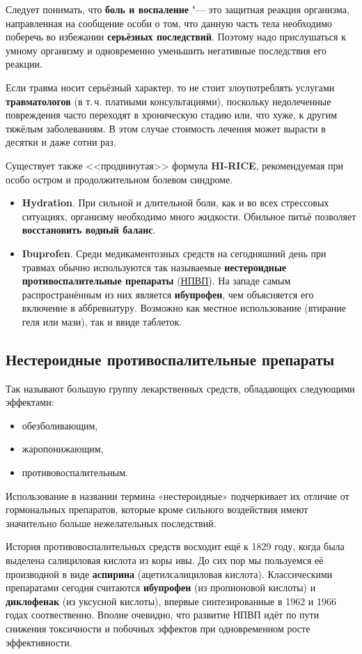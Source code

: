 \documentclass[english,russian,a4paper,12pt]{article}
\begin{document}
Следует понимать, что \textbf{боль и воспаление} "--- это защитная реакция организма, направленная
на сообщение особи о том, что данную часть тела необходимо поберечь во избежании \textbf{серьёзных последствий}.
Поэтому надо прислушаться к умному организму и одновременно уменьшить негативные последствия его реакции.

Если травма носит серьёзный характер, то не стоит злоупотреблять услугами \textbf{травматологов} (в т.\,ч. платными консультациями),
поскольку недолеченные повреждения часто переходят в хроническую стадию или, что хуже, к другим тяжёлым заболеваниям.
В этом случае стоимость лечения может вырасти в десятки и даже сотни раз.

Существует также <<продвинутая>> формула \textbf{HI-RICE}, рекомендуемая при особо остром и продолжительном болевом синдроме.
\begin{itemize}
	\item \textbf{Hydration}. При сильной и длительной боли,
	как и во всех стрессовых ситуациях, организму необходимо много жидкости.
	Обильное питьё позволяет \textbf{восстановить водный баланс}.
	\item \textbf{Ibuprofen}. Среди медикаментозных средств на сегодняшний день при травмах обычно используются
	так называемые \textbf{нестероидные противоспалительные препараты} (\href{http://ru.wikipedia.org/wiki/NSAID}{НПВП}).
	На западе самым распространённым из них является \textbf{ибупрофен}, чем объясняется его включение в аббревиатуру.
	Возможно как местное использование (втирание геля или мази), так и ввиде таблеток.
\end{itemize}

\subsection{Нестероидные противоспалительные препараты}

Так называют большую группу лекарственных средств, обладающих следующими эффектами: 
\begin{itemize}
	\item обезболивающим,
	\item жаропонижающим,
	\item противовоспалительным.
\end{itemize}
Использование в названии термина «нестероидные» подчеркивает их отличие от гормональных препаратов,
которые кроме сильного воздействия имеют значительно больше нежелательных последствий.

История противовоспалительных средств восходит ещё к 1829 году, когда была выделена салициловая кислота из коры ивы.
До сих пор мы пользуемся её производной в виде \textbf{аспирина} (ацетилсалициловая кислота).
Классическими препаратами сегодня считаются \textbf{ибупрофен} (из пропионовой кислоты) и \textbf{диклофенак} (из уксусной кислоты),
впервые синтезированные в 1962 и 1966 годах соотвественно.
Вполне очевидно, что развитие НПВП идёт по пути снижения токсичности и побочных эффектов при одновременном росте эффективности.
\end{document}
